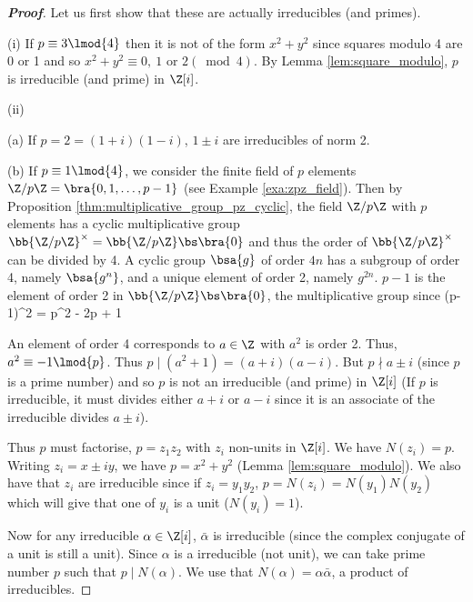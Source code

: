 \begin{proof}[\bf Proof]
Let us first show that these are actually irreducibles (and primes).
\ben
\item [(i)] If $p \equiv 3 \lmod{4}$ then it is not of the form $x^2 + y^2$ since squares modulo 4 are 0 or 1 and so $x^2 + y^2 \equiv 0,\ 1 \text{ or }2 (\bmod 4)$. By Lemma \ref{lem:square_modulo}, $p$ is irreducible (and prime) in $\Z[i]$.

\item [(ii)] \ben
\item [(a)] If $p = 2 = (1 + i)(1 - i)$, %
$1 \pm  i$ are irreducibles of norm 2.

\item [(b)] If $p \equiv 1 \lmod{4}$, we consider the finite field of $p$ elements $\Z/p\Z = \bra{0, 1,\dots , p - 1}$ (see Example \ref{exa:zpz_field}). Then by Proposition \ref{thm:multiplicative_group_pz_cyclic}, the field $\Z/p\Z$ with $p$ elements has a cyclic multiplicative group $\bb{\Z/p\Z}^{\times} = \bb{\Z/p\Z}\bs\bra{0}$ and thus the order of $\bb{\Z/p\Z}^{\times}$ can be divided by 4. A cyclic group $\bsa{g}$ of order $4n$ has a subgroup of order 4, namely $\bsa{ g^n }$, and a unique element of order 2, namely $g^{2n}$. $p - 1$ is the element of order 2 in $\bb{\Z/p\Z} \bs\bra{0}$, the multiplicative group since %
\be
(p-1)^2 = p^2 - 2p + 1  
\ee

An element of order 4 corresponds to $a \in \Z$ with $a^2$ is order 2. Thus, $a^2 \equiv -1 \lmod{p}$. Thus $p \mid (a^2 + 1) = (a + i)(a - i)$. %
But $p \nmid a \pm  i$ (since $p$ is a prime number) and so $p$ is not an irreducible (and prime) in $\Z[i]$ (If $p$ is irreducible, it must divides either $a+ i$ or $a-i$ since it is an associate of the irreducible divides $a\pm i$).

Thus $p$ must factorise, $p = z_1z_2$ with $z_i$ non-units in $\Z[i]$. We have $N(z_i) = p$. Writing $z_i = x \pm  iy$, we have $p = x^2 + y^2$ (Lemma \ref{lem:square_modulo}). We also have that $z_i$ are irreducible since if $z_i = y_1y_2$, $p = N(z_i) = N(y_1)N(y_2)$ which will give that one of $y_i$ is a unit ($N(y_i) = 1$).
\een
\een

Now for any irreducible $\alpha \in\Z[i]$, $\bar{\alpha}$ is irreducible (since the complex conjugate of a unit is still a unit). Since $\alpha$ is a irreducible (not unit), we can take prime number $p$ such that $p \mid N(\alpha)$. We use that $N(\alpha) = \alpha\bar{\alpha}$, a product of irreducibles.


\end{proof}
